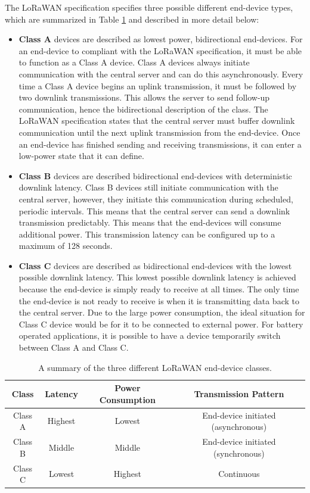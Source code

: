 The LoRaWAN specification specifies three possible different end-device types, which are summarized in Table \ref{tab:lorawan-classes} and described in more detail below:

\begin{itemize}
    \item \textbf{Class A} devices are described as lowest power, bidirectional end-devices. For an end-device to compliant with the LoRaWAN specification, it must be able to function as a Class A device. Class A devices always initiate communication with the central server and can do this asynchronously. Every time a Class A device begins an uplink transmission, it must be followed by two downlink transmissions. This allows the server to send follow-up communication, hence the bidirectional description of the class. The LoRaWAN specification states that the central server must buffer downlink communication until the next uplink transmission from the end-device. Once an end-device has finished sending and receiving transmissions, it can enter a low-power state that it can define.
    
    
    \item \textbf{Class B} devices are described bidirectional end-devices with deterministic downlink latency. Class B devices still initiate communication with the central server, however, they initiate this communication during scheduled, periodic intervals. This means that the central server can send a downlink transmission predictably. This means that the end-devices will consume additional power. This transmission latency can be configured up to a maximum of 128 seconds.
    
    
    \item \textbf{Class C} devices are described as bidirectional end-devices with the lowest possible downlink latency. This lowest possible downlink latency is achieved because the end-device is simply ready to receive at all times. The only time the end-device is not ready to receive is when it is transmitting data back to the central server. Due to the large power consumption, the ideal situation for Class C device would be for it to be connected to external power. For battery operated applications, it is possible to have a device temporarily switch between Class A and Class C.
\end{itemize}


\begin{table}[]
\centering
\begin{tabular}{|c|c|c|c|}
\hline
Class & Latency & Power Consumption & Transmission Pattern \\\hline
\hline
Class A & Highest & Lowest & End-device initiated (asynchronous) \\\hline
Class B & Middle & Middle & End-device initiated (synchronous) \\\hline
Class C & Lowest & Highest & Continuous \\\hline
\end{tabular}
\caption{A summary of the three different LoRaWAN end-device classes.}
\label{tab:lorawan-classes}
\end{table}

